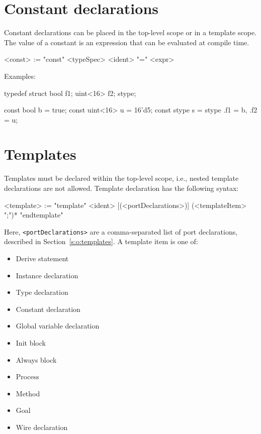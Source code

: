 \documentclass{report}
\newcommand{\src}[1]{\texttt{#1}}
\begin{document}
\section{Constant declarations}\label{s:r:constant}

Constant declarations can be placed in the top-level scope or in a
template scope.  The value of a constant is an expression that can
be evaluated at compile time.

\begin{bnflisting}{}
<const> := "const" <typeSpec> <ident> "=" <expr>
\end{bnflisting}

Examples:

\begin{tsllisting}{}
typedef struct {bool f1; uint<16> f2;} stype;

const bool     b = true;
const uint<16> u = 16'd5;
const stype    s = stype {.f1 = b, .f2 = u};
\end{tsllisting}


\section{Templates}

Templates must be declared within the top-level scope, i.e., 
nested template declarations are not allowed.  Template 
declaration has the following syntax:
\begin{bnflisting}{}
<template> := "template" <ident> [(<portDeclarations>)]
                  (<templateItem> ";")*
              "endtemplate"
\end{bnflisting}
Here, \src{<portDeclarations>} are a comma-separated list of 
port declarations, described in Section~\ref{s:o:templates}.  A 
template item is one of:
\begin{itemize}
    \item Derive statement
    \item Instance declaration
    \item Type declaration
    \item Constant declaration
    \item Global variable declaration
    \item Init block
    \item Always block
    \item Process
    \item Method
    \item Goal
    \item Wire declaration
\end{itemize}
\end{document}
